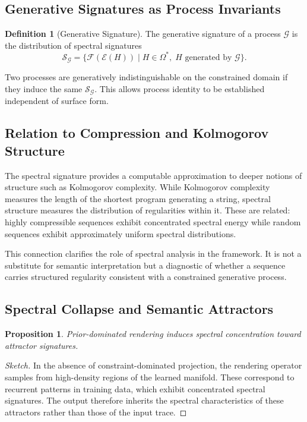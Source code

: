 \documentclass[12pt, a4paper]{article}
\theoremstyle{plain}
\newtheorem{proposition}[theorem]{Proposition}
\theoremstyle{definition}
\newtheorem{definition}[theorem]{Definition}
\theoremstyle{remark}
\begin{document}
\subsection{Generative Signatures as Process Invariants}

\begin{definition}[Generative Signature]
The generative signature of a process $\mathcal{G}$ is the distribution of spectral signatures
\[
\mathcal{S}_{\mathcal{G}} = \{ \mathcal{F}(\mathcal{E}(H)) \mid H \in \Omega^*,\; H \text{ generated by } \mathcal{G} \}.
\]
\end{definition}

Two processes are generatively indistinguishable on the constrained domain if they induce the same $\mathcal{S}_{\mathcal{G}}$. This allows process identity to be established independent of surface form.

\subsection{Relation to Compression and Kolmogorov Structure}

The spectral signature provides a computable approximation to deeper notions of structure such as Kolmogorov complexity. While Kolmogorov complexity measures the length of the shortest program generating a string, spectral structure measures the distribution of regularities within it. These are related: highly compressible sequences exhibit concentrated spectral energy while random sequences exhibit approximately uniform spectral distributions.

This connection clarifies the role of spectral analysis in the framework. It is not a substitute for semantic interpretation but a diagnostic of whether a sequence carries structured regularity consistent with a constrained generative process.

\subsection{Spectral Collapse and Semantic Attractors}

\begin{proposition}
Prior-dominated rendering induces spectral concentration toward attractor signatures.
\end{proposition}

\begin{proof}[Sketch]
In the absence of constraint-dominated projection, the rendering operator samples from high-density regions of the learned manifold. These correspond to recurrent patterns in training data, which exhibit concentrated spectral signatures. The output therefore inherits the spectral characteristics of these attractors rather than those of the input trace.
\end{proof}
\end{document}
